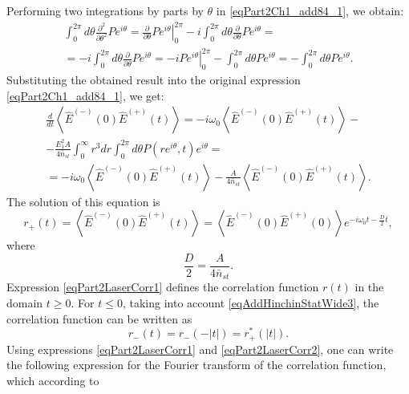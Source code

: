 Performing two integrations by parts by $\theta$ in \eqref{eqPart2Ch1_add84_1}, we obtain:
\begin{eqnarray}
\int_0^{2 \pi}
d \theta
\frac{\partial^2}{\partial \theta^2}P e^{i \theta} = 
\left.\frac{\partial}{\partial \theta}P e^{i \theta}\right|_0^{2 \pi}
- 
i \int_0^{2 \pi}
d \theta
\frac{\partial}{\partial \theta}P e^{i \theta} = 
\nonumber \\
= - i \int_0^{2 \pi}
d \theta
\frac{\partial}{\partial \theta}P e^{i \theta}  
= 
- i \left.P e^{i \theta}\right|_0^{2 \pi}
-
\int_0^{2 \pi}
d \theta
P e^{i \theta} = 
- \int_0^{2 \pi}
d \theta
P e^{i \theta}.
\nonumber
\end{eqnarray}
Substituting the obtained result into the original expression
\eqref{eqPart2Ch1_add84_1}, we get:
\begin{eqnarray}
\frac{d}{dt}\left<\hat{E}^{(-)}\left(0\right)\hat{E}^{(+)}\left(t\right)\right>
=
-i \omega_0
\left<\hat{E}^{(-)}\left(0\right)\hat{E}^{(+)}\left(t\right)\right>-
\nonumber \\
-
\frac{E_1^2 A}{4 \bar{n}_{st}} 
\int_0^{\infty}r^3 d r 
\int_0^{2 \pi}
d \theta
P\left(r
e^{i \theta}, t\right) e^{i \theta} = 
\nonumber \\
=-i \omega_0
\left<\hat{E}^{(-)}\left(0\right)\hat{E}^{(+)}\left(t\right)\right> -
\frac{A}{4 \bar{n}_{st}}\left<\hat{E}^{(-)}\left(0\right)\hat{E}^{(+)}\left(t\right)\right>.
\nonumber
\end{eqnarray}
The solution of this equation is
\begin{equation}
r_{+}\left(t\right) = \left<\hat{E}^{(-)}\left(0\right)\hat{E}^{(+)}\left(t\right)\right> =
\left<\hat{E}^{(-)}\left(0\right)\hat{E}^{(+)}\left(0\right)\right>
e^{-i \omega_0 t - \frac{D}{2}t},
\label{eqPart2LaserCorr1}
\end{equation}
where
\[
\frac{D}{2} = \frac{A}{4 \bar{n}_{st}}.
\]
Expression \eqref{eqPart2LaserCorr1} defines the correlation function
$r\left(t\right)$ in the domain $t \ge 0$. For $t \le 0$, taking into account
\eqref{eqAddHinchinStatWide3}, the correlation function can be written as  
\begin{equation}
r_{-}\left(t\right) = r_{-}\left(-\left|t\right|\right) =
r_{+}^{*}\left(\left|t\right|\right). 
\label{eqPart2LaserCorr2}
\end{equation}
Using expressions \eqref{eqPart2LaserCorr1} and
\eqref{eqPart2LaserCorr2}, one can write the following expression for the Fourier transform of the correlation function, which according to 
